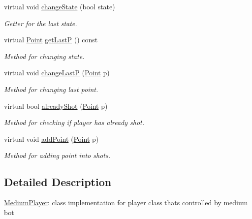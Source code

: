 \begin{DoxyCompactItemize}
\mbox{\label{class_medium_player_ae0f69d678d6567e09baed0350468be61}} 
virtual void \mbox{\hyperlink{class_medium_player_ae0f69d678d6567e09baed0350468be61}{change\+State}} (bool state)
\begin{DoxyCompactList}\small\item\em Getter for the last state. \end{DoxyCompactList}\item 
\mbox{\label{class_medium_player_abd585986250a5b713d6a554ea70e3ba6}} 
virtual \mbox{\hyperlink{class_point}{Point}} \mbox{\hyperlink{class_medium_player_abd585986250a5b713d6a554ea70e3ba6}{get\+LastP}} () const
\begin{DoxyCompactList}\small\item\em Method for changing state. \end{DoxyCompactList}\item 
virtual void \mbox{\hyperlink{class_medium_player_afc952f7dac91d979743154c021d8dee8}{change\+LastP}} (\mbox{\hyperlink{class_point}{Point}} p)
\begin{DoxyCompactList}\small\item\em Method for changing last point. \end{DoxyCompactList}\item 
virtual bool \mbox{\hyperlink{class_medium_player_a0c237af510ff84898759ed2e9a9271ce}{already\+Shot}} (\mbox{\hyperlink{class_point}{Point}} p)
\begin{DoxyCompactList}\small\item\em Method for checking if player has already shot. \end{DoxyCompactList}\item 
virtual void \mbox{\hyperlink{class_medium_player_a4cd5cbf0327e002112c80a52b279358f}{add\+Point}} (\mbox{\hyperlink{class_point}{Point}} p)
\begin{DoxyCompactList}\small\item\em Method for adding point into shots. \end{DoxyCompactList}\end{DoxyCompactItemize}


\subsection{Detailed Description}
\mbox{\hyperlink{class_medium_player}{Medium\+Player}}\+: class implementation for player class that\textquotesingle{}s controlled by medium bot 

